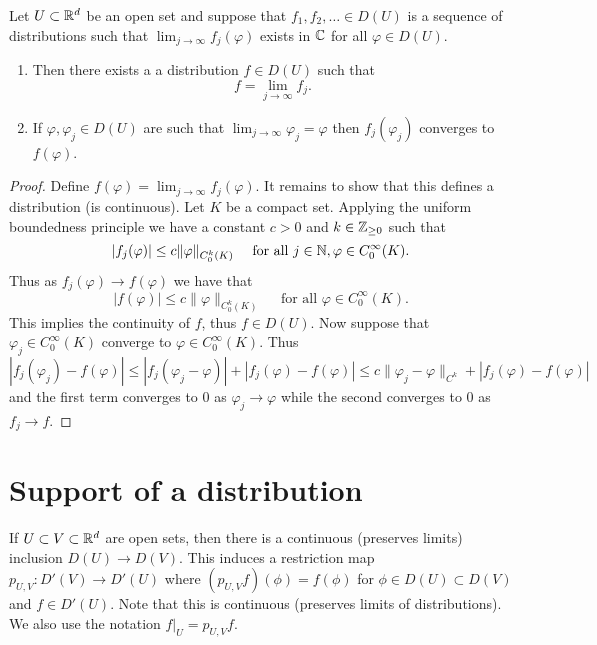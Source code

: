 \documentclass[twoside, a4paper, 10pt]{amsart}
\begin{document}
\begin{thm} Let $U \subset \mathbb{R}^d$ be an open set and suppose that $f_1,f_2, \ldots \in D(U)$ is a sequence of distributions such that $\lim_{j\to \infty} f_j(\varphi)$ exists in $\mathbb{C}$ for all $\varphi \in D(U)$. 
\begin{enumerate}
	\item Then there exists a a distribution $f \in D(U)$ such that $$f = \lim_{j \to \infty} f_j.$$
	\item If $\varphi, \varphi_j \in D(U)$ are such that $\lim_{j \to \infty} \varphi_j = \varphi$ then $f_j(\varphi_j)$ converges to $f(\varphi)$.
\end{enumerate}

\end{thm}

\begin{proof} Define $f(\varphi) = \lim_{j \to \infty} f_j(\varphi)$. It remains to show that this defines a distribution (is continuous). Let $K$ be a compact set. Applying the uniform boundedness principle we have a constant $c>0$ and $k \in \mathbb{Z}_{\geq 0}$ such that $$|f_j(\varphi)| \leq c \| \varphi \|_{C_0^k(K)} \quad \text{ for all } j \in \mathbb{N}, \varphi \in C_0^{\infty}(K).$$ Thus as $f_j(\varphi) \to f(\varphi)$ we have that $$|f(\varphi)| \leq c \| \varphi \|_{C_0^k(K)} \quad \text{ for all } \varphi \in C_0^{\infty}(K).$$ This implies the continuity of $f$, thus $f \in D(U)$. Now suppose that $\varphi_j \in C_0^{\infty}(K)$ converge to $\varphi \in C_0^{\infty}(K)$. Thus $$|f_j(\varphi_j) - f(\varphi)| \leq |f_j(\varphi_j - \varphi)| + |f_j(\varphi) - f(\varphi)| \leq c\|\varphi_j - \varphi\|_{C^k} +  |f_j(\varphi) - f(\varphi)|$$ and the first term converges to $0$ as $\varphi_j \to \varphi$ while the second converges to $0$ as $f_j \to f$.\end{proof}

\fi

\section{Support of a distribution}

If $U \subset V \subset \mathbb{R}^d$ are open sets, then there is a continuous (preserves limits) inclusion $D(U) \to D(V)$. This induces a restriction map $p_{U,V}:D'(V) \to D'(U)$ where $(p_{U,V}f)(\phi) = f(\phi)$ for $\phi \in D(U) \subset D(V)$ and $f \in D'(U)$. Note that this is continuous (preserves limits of distributions). We also use the notation $f|_U = p_{U,V}f$.
\end{document}
